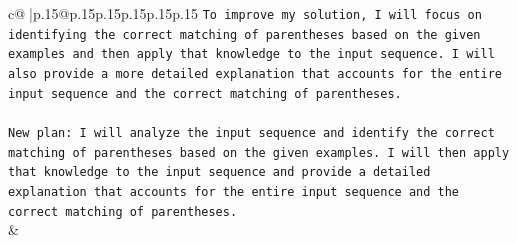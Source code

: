\documentclass{article}
\begin{document}
{\begin{supertabular}{c@{$\;$}|p{.15\linewidth}@{}p{.15\linewidth}p{.15\linewidth}p{.15\linewidth}p{.15\linewidth}p{.15\linewidth}}
{{{\texttt{To improve my solution, I will focus on identifying the correct matching of parentheses based on the given examples and then apply that knowledge to the input sequence. I will also provide a more detailed explanation that accounts for the entire input sequence and the correct matching of parentheses.} \\
\\ 
\texttt{New plan: I will analyze the input sequence and identify the correct matching of parentheses based on the given examples. I will then apply that knowledge to the input sequence and provide a detailed explanation that accounts for the entire input sequence and the correct matching of parentheses.} \\
            }
        }
    }
    & \\ \\

\end{supertabular}
}
\end{document}
